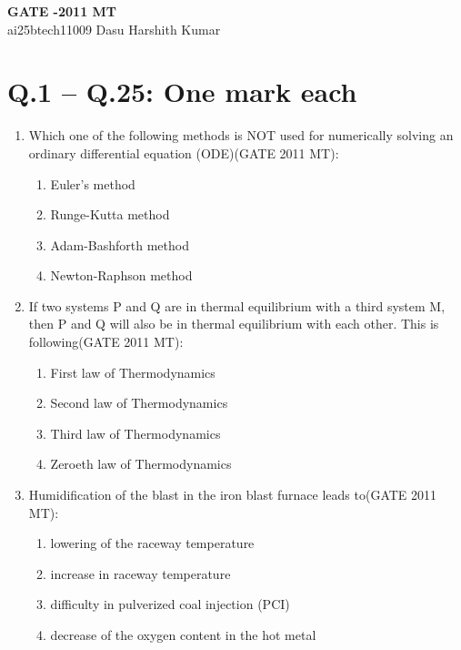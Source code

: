 \documentclass[12pt]{article}
\begin{document}
\begin{center}
    {\LARGE \textbf{GATE -2011 MT}} \\
    \vspace{1em}
    ai25btech11009 \qquad Dasu Harshith Kumar
\end{center}

\section*{Q.1 -- Q.25: One mark each}

\begin{enumerate}

\item Which one of the following methods is NOT used for numerically solving an ordinary differential equation (ODE)(GATE 2011 MT):
    \begin{enumerate}
        \item Euler's method
        \item Runge-Kutta method
        \item Adam-Bashforth method
        \item Newton-Raphson method
    \end{enumerate}

\item If two systems P and Q are in thermal equilibrium with a third system M, then P and Q will also be in thermal equilibrium with each other. This is following(GATE 2011 MT):
    \begin{enumerate}
        \item First law of Thermodynamics
        \item Second law of Thermodynamics
        \item Third law of Thermodynamics
        \item Zeroeth law of Thermodynamics
    \end{enumerate}

\item Humidification of the blast in the iron blast furnace leads to(GATE 2011 MT):
    \begin{enumerate}
        \item lowering of the raceway temperature
        \item increase in raceway temperature
        \item difficulty in pulverized coal injection (PCI)
        \item decrease of the oxygen content in the hot metal
    \end{enumerate}


\end{enumerate}
\end{document}
